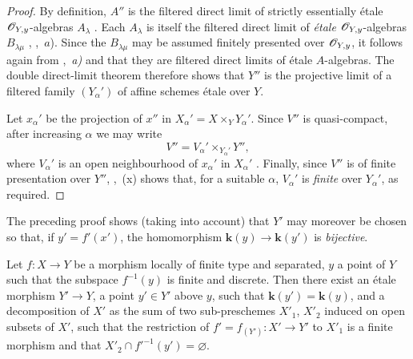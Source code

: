 \begin{proof}
By definition, $A''$ is the filtered direct limit of strictly essentially \'etale $\mathscr{O}_{Y,y}$-algebras $A_\lambda$ . Each $A_\lambda$ is itself the filtered direct limit of \emph{\'etale} $\mathscr{O}_{Y,y}$-algebras $B_{\lambda\mu}$ , ,~$a$). Since the $B_{\lambda\mu}$ may be assumed finitely presented over $\mathscr{O}_{Y,y}$, it follows again from ,~\emph{a)} and  that they are filtered direct limits of \'etale $A$-algebras. The double direct-limit theorem therefore shows that $Y''$ is the projective limit of a filtered family $(Y_\alpha')$ of affine schemes \'etale over $Y$.

Let $x_\alpha'$ be the projection of $x''$ in $X_\alpha'=X\times_{Y}Y_\alpha'$. Since $V''$ is quasi-compact, after increasing $\alpha$ we may write
\[
  V''=V_\alpha'\times_{Y_\alpha'}Y'',
\]
where $V_\alpha'$ is an open neighbourhood of $x_\alpha'$ in $X_\alpha'$ . Finally, since $V''$ is of finite presentation over $Y''$, ,~(x) shows that, for a suitable $\alpha$, $V_\alpha'$ is \emph{finite} over $Y_\alpha'$, as required.
\end{proof}

\begin{remark}[18.12.2]
\label{IV.18.12.2}
The preceding proof shows (taking  into account) that $Y'$ may moreover be chosen so that, if $y'=f'(x')$, the homomorphism $\boldsymbol{k}(y)\to\boldsymbol{k}(y')$ is \emph{bijective}.
\end{remark}

\begin{corollary}[18.12.3]
\label{IV.18.12.3}
Let $f:X\to Y$ be a morphism locally of finite type and separated, $y$ a point of $Y$ such that the subspace $f^{-1}(y)$ is finite and discrete.
Then there exist an \'etale morphism $Y'\to Y$, a point $y'\in Y'$ above $y$, such that $\boldsymbol{k}(y')=\boldsymbol{k}(y)$, and a decomposition of $X'$ as the sum of two sub-preschemes $X'_1$, $X'_2$ induced on open subsets of $X'$, such that the restriction of $f'=f_{(Y')}:X'\to Y'$ to $X'_1$ is a finite morphism and that $X'_2\cap f'^{-1}(y')=\varnothing$.
\end{corollary}

